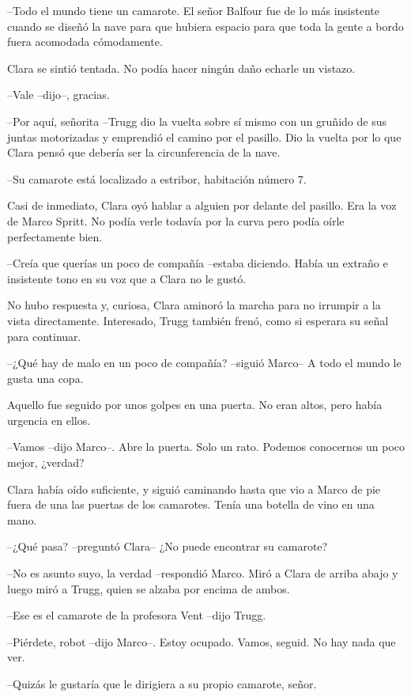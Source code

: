 {--Todo el mundo tiene un camarote. El señor Balfour fue de lo más
 insistente cuando se diseñó la nave para que hubiera espacio para que
toda la gente a bordo fuera acomodada cómodamente.}

{Clara se sintió tentada. No podía hacer ningún daño echarle un
vistazo.}

{--Vale --dijo--, gracias.}

{--Por aquí, señorita --Trugg dio la vuelta sobre sí mismo con un gruñido
 de sus juntas motorizadas y emprendió el camino por el pasillo. Dio la
 vuelta por lo que Clara pensó que debería ser la circunferencia de la
nave.}

{--Su camarote está localizado a estribor, habitación número 7.}

{Casi de inmediato, Clara oyó hablar a alguien por delante del pasillo.
 Era la voz de Marco Spritt. No podía verle todavía por la curva pero
podía oírle perfectamente bien.}

{--Creía que querías un poco de compañía --estaba diciendo. Había un
extraño e insistente tono en su voz que a Clara no le gustó.}

{No hubo respuesta y, curiosa, Clara aminoró la marcha para no irrumpir a
 la vista directamente. Interesado, Trugg también frenó, como si esperara
su señal para continuar.}

{--¿Qué hay de malo en un poco de compañía? --siguió Marco-- A todo el
mundo le gusta una copa.}

{Aquello fue seguido por unos golpes en una puerta. No eran altos, pero
había urgencia en ellos.}

{--Vamos --dijo Marco--. Abre la puerta. Solo un rato. Podemos conocernos
un poco mejor, ¿verdad?}

{Clara había oído suficiente, y siguió caminando hasta que vio a Marco de
 pie fuera de una las puertas de los camarotes. Tenía una botella de vino
en una mano.}

{--¿Qué pasa? --preguntó Clara-- ¿No puede encontrar su camarote?}

{--No es asunto suyo, la verdad --respondió Marco. Miró a Clara de arriba
abajo y luego miró a Trugg, quien se alzaba por encima de ambos.}

{--Ese es el camarote de la profesora Vent --dijo Trugg.}

{--Piérdete, robot --dijo Marco--. Estoy ocupado. Vamos, seguid. No hay
nada que ver.}

{--Quizás le gustaría que le dirigiera a su propio camarote, señor.}

